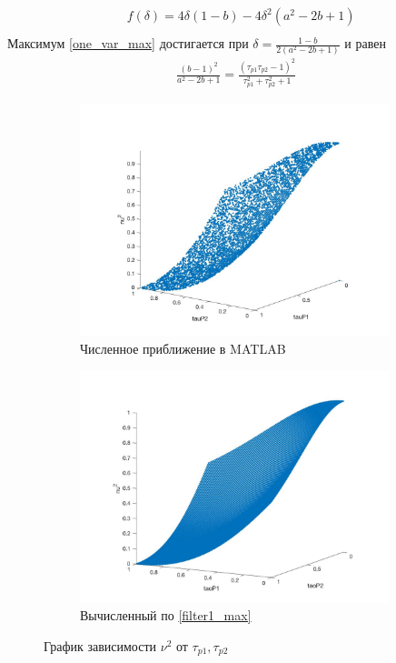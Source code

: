 \documentclass[a4paper]{article}
\begin{document}
\begin{equation}\label{one_var_max}
 \begin{aligned}
&f(\delta) = 4\delta(1 - b) - 4\delta^2(a^2 -2b +1)\\
 \end{aligned}
\end{equation} 
Максимум  \eqref{one_var_max} достигается при $\delta = \frac{1-b}{2(a^2 - 2b + 1)}$ и равен
\begin{equation}\label{filter1_max}
 \begin{aligned}
\frac{(b - 1)^2}{a^2 - 2b + 1} = \frac{(\tau_{p1}\tau_{p2} - 1)^2}{\tau_{p1}^2 + \tau_{p2}^2 + 1} 
 \end{aligned}
\end{equation} 

\begin{figure}[H]
\begin{subfigure}{.5\textwidth}
  \includegraphics[width=9cm]{images/filter1e.jpg}
  \caption{Численное приближение в MATLAB}
  \label{fig:sub1}
\end{subfigure}%
\begin{subfigure}{.5\textwidth}
\includegraphics[width=9cm]{images/filter1_1.jpg}
  \caption{Вычисленный по \eqref{filter1_max}}
  \label{fig:sub2}
\end{subfigure}
\caption{График зависимости $\nu^2$ от $\tau_{p1}, \tau_{p2}$}
\label{fig:filter1_fig}
\end{figure}
\end{document}
